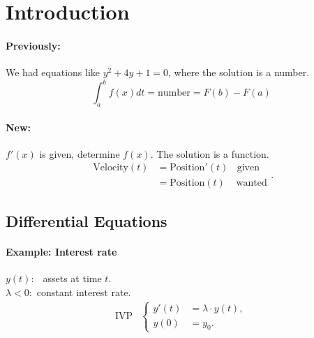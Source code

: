 \documentclass[]{article}
\begin{document}
\section{Introduction}
	\paragraph{Previously:}
	We had equations like  $y ^{2}+4y+1=0$, where the solution is a number.
	\[
		\int_{a}^{b} f(x) dt = \text{number} = F(b)-F(a)	
	\]
	\paragraph{New:}
	$ f'(x) $ is given, determine $ f(x) $. The solution is a function.
	\[
		\begin{split}
			\text{Velocity}(t) & = \text{Position}'(t)~~~~  \text{given}  \\
					   & = \text{Position}(t)~~~~~  \text{wanted}
		\end{split}
	.\]
	\subsection{Differential Equations}
	\begin{multicols}{2}
	\paragraph{Example:
	Interest rate}
	$~$\\
	$y(t):~~$ assets at time $t$. \\
	$\lambda<0:$ constant interest rate.
	\[
	\begin{split}
		\text{IVP}&
	\begin{cases} 
		y'(t) & =\lambda\cdot y(t), \\
		y(0) & =y_0.
	\end{cases}\\
	\end{split}
	\]$~$
	\begin{center}
	\end{center}	
	\end{multicols}
\end{document}
